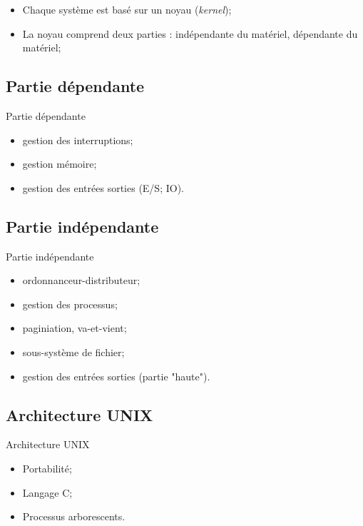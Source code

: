 \begin{frame}{\sectitle}
\begin{block}{\subsectitle}
\begin{itemize}
    \item Chaque système est basé sur un noyau (\textit{kernel});
    \item La noyau comprend deux parties : indépendante du matériel, dépendante
    du matériel;
\end{itemize}
\end{block}

\def\subsectitle{Partie dépendante}
\subsection{\subsectitle}
\begin{block}{\subsectitle}
\begin{itemize}
    \item gestion des interruptions;
    \item gestion mémoire;
    \item gestion des entrées sorties (E/S; IO).
\end{itemize}

\end{block}
\end{frame}

\def\subsectitle{Partie indépendante}
\subsection{\subsectitle}

\begin{frame}{\sectitle}
\begin{block}{\subsectitle}
\begin{itemize}
    \item ordonnanceur-distributeur;
    \item gestion des processus;
    \item paginiation, va-et-vient;
    \item sous-système de fichier;
    \item gestion des entrées sorties (partie "haute").
\end{itemize}
\end{block}

\def\subsectitle{Architecture UNIX}
\subsection{\subsectitle}

\begin{block}{\subsectitle}
\begin{itemize}
    \item Portabilité;
    \item Langage C;
    \item Processus arborescents.
\end{itemize}
\end{block}
\end{frame}

